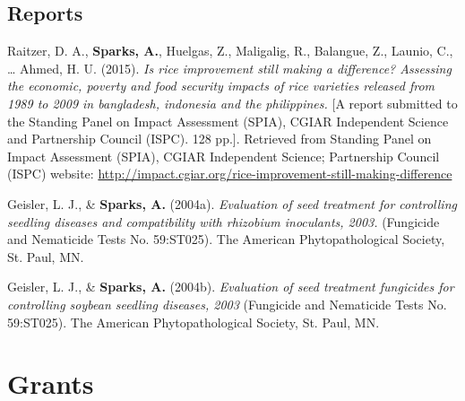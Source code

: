 \documentclass[11pt, a4paper]{awesome-cv}
\begin{document}
\endgroup

\hypertarget{reports}{%
\subsection{Reports}\label{reports}}

\begingroup
\setlength{\parindent}{-0.5in}
\setlength{\leftskip}{0.5in}

\hypertarget{refs_reports}{}
\leavevmode\hypertarget{ref-Raitzer2015}{}%
Raitzer, D. A., \textbf{Sparks, A.}, Huelgas, Z., Maligalig, R., Balangue, Z., Launio, C., \ldots{} Ahmed, H. U. (2015). \emph{Is rice improvement still making a difference? Assessing the economic, poverty and food security impacts of rice varieties released from 1989 to 2009 in bangladesh, indonesia and the philippines.} {[}A report submitted to the Standing Panel on Impact Assessment (SPIA), CGIAR Independent Science and Partnership Council (ISPC). 128 pp.{]}. Retrieved from Standing Panel on Impact Assessment (SPIA), CGIAR Independent Science; Partnership Council (ISPC) website: \url{http://impact.cgiar.org/rice-improvement-still-making-difference}

\leavevmode\hypertarget{ref-Geisler2004}{}%
Geisler, L. J., \& \textbf{Sparks, A.} (2004a). \emph{Evaluation of seed treatment for controlling seedling diseases and compatibility with rhizobium inoculants, 2003.} (Fungicide and Nematicide Tests No. 59:ST025). The American Phytopathological Society, St. Paul, MN.

\leavevmode\hypertarget{ref-Geisler2004a}{}%
Geisler, L. J., \& \textbf{Sparks, A.} (2004b). \emph{Evaluation of seed treatment fungicides for controlling soybean seedling diseases, 2003} (Fungicide and Nematicide Tests No. 59:ST025). The American Phytopathological Society, St. Paul, MN.

\endgroup

\hypertarget{grants}{%
\section{Grants}\label{grants}}
\end{document}
